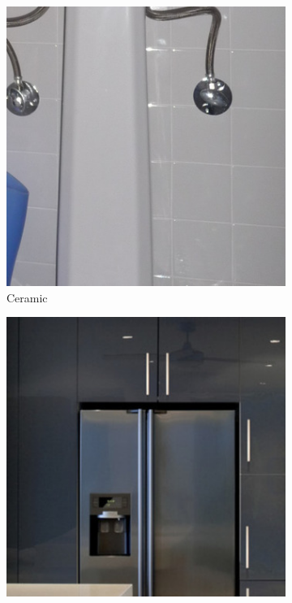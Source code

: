 \documentclass[12pt,a4paper]{article}
\begin{document}
\begin{figure}
\begin{subfigure}[c]{0.23\linewidth}
			\includegraphics[width=\linewidth]{./imgs/minc2}
			\caption{Ceramic}
			\vspace{5mm}
		\end{subfigure}
		\begin{subfigure}[c]{0.23\linewidth}
			\includegraphics[width=\linewidth]{./imgs/minc3}

\end{subfigure}
\end{figure}
\end{document}
